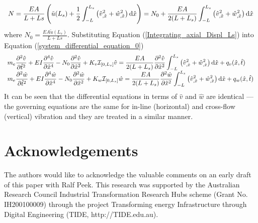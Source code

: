 \documentclass[3p,doublespacing,authoryear,11pt]{elsarticle} %
\begin{document}
  \begin{equation}\label{Integrating_axial_Displ_Ls}
  \begin{array}{l } 
  \displaystyle N  = \frac{EA}{L+Ls}\left( \tilde{u} (L_s) +  \frac{1}{2} \int_{-L}^{L_s} \left( \hat{v}_{,\hat{x}}^2 + \hat{w}_{,\hat{x}}^2 \right) \textup{d} \hat{x} \right)= N_0 + \frac{EA}{2(L+L_s)} \int_{-L}^{L_s} \left( \hat{v}_{,\hat{x}}^2 + \hat{w}_{,\hat{x}}^2 \right) \textup{d} \hat{x}   
  \end{array}  
\end{equation}
where $N_0 = \frac{EA \tilde{u} (L_s)}{L+Ls} $.  Substituting Equation (\ref{Integrating_axial_Displ_Ls}) into Equation (\ref{system_differential_equation_0})
  \begin{equation}\label{system_differential_equation}
  \begin{array}{l } 
  \displaystyle m_e  \frac{\partial^2 \hat{v}}{\partial \hat{t}^2} + EI \frac{\partial^4 \hat{v}}{\partial \hat{x}^4} - N_0 \frac{\partial^2 \hat{v}}{\partial \hat{x}^2} + K_v \mathcal{I}_{[0,L_s]} \hat{v} =\frac{EA}{2(L+L_s)} \frac{\partial^2 \hat{v}}{\partial \hat{x}^2}  \int_{-L}^{L_s} \left( \hat{v}_{,\hat{x}}^2 + \hat{w}_{,\hat{x}}^2 \right) \textup{d} \hat{x}  + q_v(\hat{x},\hat{t}) \\ 
    \displaystyle m_e  \frac{\partial^2 \hat{w}}{\partial \hat{t}^2} + EI \frac{\partial^4 \hat{w}}{\partial \hat{x}^4} - N_0 \frac{\partial^2 \hat{w}}{\partial \hat{x}^2} + K_w \mathcal{I}_{[0,L_s]} \hat{w} =\frac{EA}{2(L+L_s)} \frac{\partial^2 \hat{w}}{\partial \hat{x}^2}  \int_{-L}^{L_s} \left( \hat{v}_{,\hat{x}}^2 + \hat{w}_{,\hat{x}}^2 \right) \textup{d} \hat{x}  + q_w(\hat{x},\hat{t})  
  \end{array}  
\end{equation} 
It can be seen that the differential equations in terms of $\hat{v}$ and $\hat{w}$ are identical --- the governing equations are the same for in-line (horizontal) and cross-flow (vertical) vibration and they are treated in a similar manner. 
 
 
\section*{Acknowledgements} The authors would like to acknowledge the valuable comments on an early draft of this paper with Ralf Peek. This research was supported by the Australian Research Council Industrial Transformation Research Hubs scheme (Grant No. IH200100009) through the project Transforming energy Infrastructure through Digital Engineering (TIDE, http://TIDE.edu.au).



%


    
\end{document}
